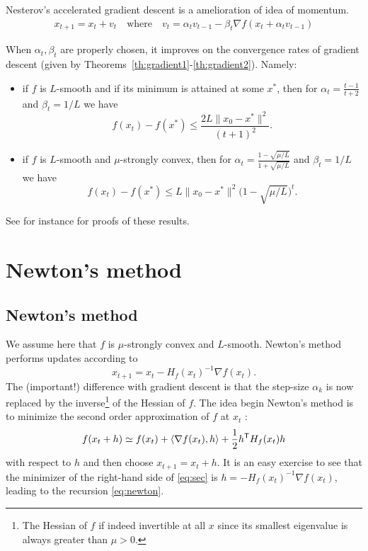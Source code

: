 \documentclass[11pt,nocut]{article}
\begin{document}
Nesterov's accelerated gradient descent is a amelioration of idea of momentum.
\begin{align*}
	x_{t+1} = x_t + v_t
	\quad \text{where} \quad
	v_t = \alpha_t v_{t-1} - \beta_t \nabla f(x_{t} + \alpha_t v_{t-1})
\end{align*}

When $\alpha_t,\beta_t$ are properly chosen, it improves on the convergence rates of gradient descent (given by Theorems~\ref{th:gradient1}-\ref{th:gradient2}). Namely:
\begin{itemize}
	\item if $f$ is $L$-smooth and if its minimum is attained at some $x^*$, then for $\alpha_t = \frac{t-1}{t+2}$ and $\beta_t = 1/L$ we have
		$$
		f(x_t) - f(x^*) \leq \frac{2L \|x_0-x^*\|^2}{(t+1)^2}.
		$$
	\item if $f$ is $L$-smooth and $\mu$-strongly convex, then for $\alpha_t = \frac{1-\sqrt{\mu/L}}{1+\sqrt{\mu/L}}$ and $\beta_t = 1/L$ we have
		$$
		f(x_t) - f(x^*) \leq L \|x_0-x^*\|^2 \Big(1-\sqrt{\mu/L}\Big)^t.
		$$
\end{itemize}
See for instance \cite{schmidt2011convergence} for proofs of these results.


\section{Newton's method}

\subsection{Newton's method}
We assume here that $f$ is $\mu$-strongly convex and $L$-smooth.
Newton's method performs updates according to
\begin{equation}\label{eq:newton}
	x_{t+1} = x_t - H_f(x_t)^{-1} \nabla f(x_t).
\end{equation}
The (important!) difference with gradient descent is that the step-size $\alpha_k$ is now replaced by the inverse\footnote{The Hessian of $f$ if indeed invertible at all $x$ since its smallest eigenvalue is always greater than $\mu >0$.} of the Hessian of $f$. The idea begin Newton's method is to minimize the second order approximation of $f$ at $x_t$ :
\begin{equation}\label{eq:sec}
	f(x_t+h) \simeq f(x_t) + \langle \nabla f(x_t), h \rangle + \frac{1}{2} h^{{\sf T}} H_f(x_t) h
\end{equation}
with respect to $h$ and then choose $x_{t+1} = x_t + h$. It is an easy exercise to see that the minimizer of the right-hand side of \eqref{eq:sec} is $h=- H_f(x_t)^{-1} \nabla f(x_t)$, leading to the recursion \eqref{eq:newton}.
\\
\end{document}
